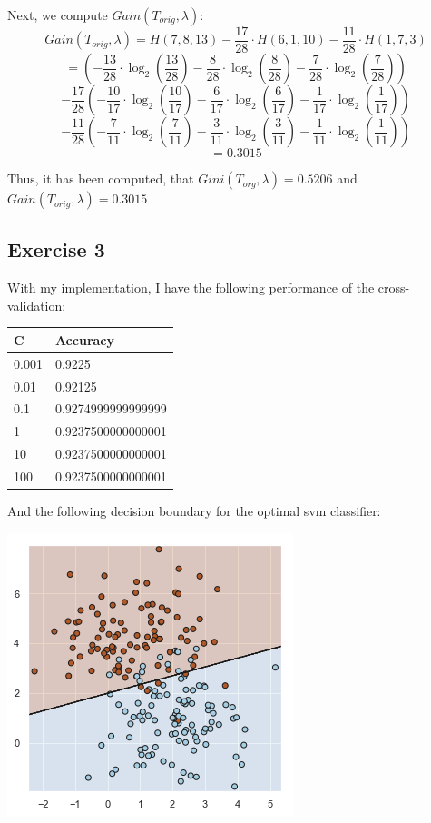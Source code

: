 \documentclass{report}
\begin{document}
Next, we compute $Gain(T_{orig}, \lambda)$:
$$Gain(T_{orig}, \lambda) = H(7, 8, 13) - \frac{17}{28} \cdot H(6, 1, 10) - \frac{11}{28} \cdot H(1, 7, 3)$$
$$ = \left(-\frac{13}{28} \cdot \log_2 \left(\frac{13}{28} \right) - \frac{8}{28} \cdot \log_2 \left( \frac{8}{28} \right) - \frac{7}{28} \cdot \log_2 \left( \frac{7}{28} \right) \right)$$
$$ - \frac{17}{28} \left( - \frac{10}{17} \cdot \log_2 \left( \frac{10}{17} \right) - \frac{6}{17} \cdot \log_2 \left( \frac{6}{17} \right) - \frac{1}{17} \cdot \log_2 \left( \frac{1}{17} \right) \right)$$
$$ - \frac{11}{28} \left( - \frac{7}{11} \cdot \log_2 \left( \frac{7}{11} \right) - \frac{3}{11} \cdot \log_2 \left( \frac{3}{11} \right) - \frac{1}{11} \cdot \log_2 \left( \frac{1}{11} \right) \right)$$
$$= 0.3015$$

Thus, it has been computed, that $Gini(T_{org}, \lambda) = 0.5206$ and $Gain(T_{orig}, \lambda) = 0.3015$

\subsection*{Exercise 3}
With my implementation, I have the following performance of the cross-validation:
\begin{center}
    \begin{tabular}{|l|l|}
        \hline
        C & Accuracy \\
        \hline
        0.001 & 0.9225 \\
        \hline
        0.01 & 0.92125 \\
        \hline
        0.1 & 0.9274999999999999 \\
        \hline
        1 & 0.9237500000000001 \\
        \hline
        10 & 0.9237500000000001 \\
        \hline
        100 & 0.9237500000000001 \\
        \hline
    \end{tabular}
\end{center}
And the following decision boundary for the optimal svm classifier:
\begin{center}
    \includegraphics[height = 7 cm]{3_decision_boundary.png}
\end{center}
\end{document}
